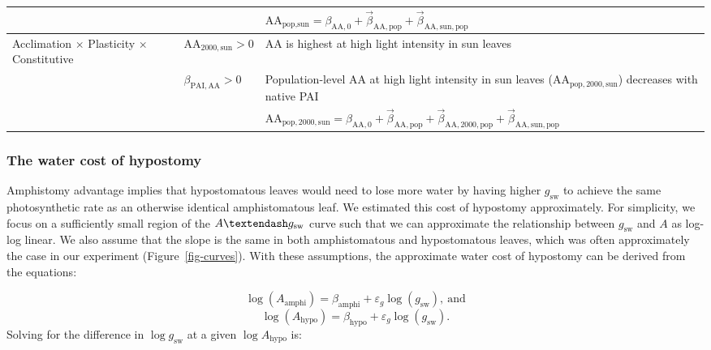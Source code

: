 \documentclass[
  letterpaper,
  DIV=11,
  numbers=noendperiod]{scrartcl}
\newcommand{\aax}{$\mathrm{AA}$}
\newcommand{\agcurve}{$A \textendash g_\text{sw}$}
\newcommand{\gsw}{$g_\text{sw}$}
\begin{document}
\begin{longtable}{>{\raggedright\arraybackslash}p{1in}>{\raggedright\arraybackslash}p{1.5in}>{\raggedright\arraybackslash}p{3in}}
\nopagebreak
 &  & \hspace{-1em}$\mathrm{AA}_{\text{pop},\text{sun}} = \beta_{\mathrm{AA}, 0} + \vec{\beta}_{\mathrm{AA}, \text{pop}} + \vec{\beta}_{\mathrm{AA}, \text{sun}, \text{pop}}$\\
\cmidrule{1-3}\pagebreak[0]
Acclimation $\times$ Plasticity $\times$ Constitutive & $\mathrm{AA}_{2000,\text{sun}} > 0$ & \hspace{-1em}\aax{} is highest at high light intensity in sun leaves\\
\nopagebreak
 & $\beta_{\mathrm{PAI,AA}} > 0$ & \hspace{-1em}Population-level \aax{} at high light intensity in sun leaves ($\mathrm{AA}_{\text{pop},2000,\text{sun}}$) decreases with native PAI\\
\nopagebreak
 &  & \hspace{-1em}$\mathrm{AA}_{\text{pop},2000,\text{sun}} = \beta_{\mathrm{AA}, 0} + \vec{\beta}_{\mathrm{AA}, \text{pop}} + \vec{\beta}_{\mathrm{AA}, 2000, \text{pop}} + \vec{\beta}_{\mathrm{AA}, \text{sun}, \text{pop}}$\\
\bottomrule

\end{longtable}

\subsubsection{The water cost of
hypostomy}\label{the-water-cost-of-hypostomy}

Amphistomy advantage implies that hypostomatous leaves would need to
lose more water by having higher \gsw{} to achieve the same
photosynthetic rate as an otherwise identical amphistomatous leaf. We
estimated this cost of hypostomy approximately. For simplicity, we focus
on a sufficiently small region of the \agcurve{} curve such that we can
approximate the relationship between \gsw{} and \(A\) as log-log linear.
We also assume that the slope is the same in both amphistomatous and
hypostomatous leaves, which was often approximately the case in our
experiment (Figure~\ref{fig-curves}). With these assumptions, the
approximate water cost of hypostomy can be derived from the equations:

\[\log(A_{\mathrm{amphi}}) = \beta_\text{amphi} + \varepsilon_g \log(g_\text{sw}),~\text{and}\]
\[\log(A_{\mathrm{hypo}}) = \beta_\text{hypo} + \varepsilon_g \log(g_\text{sw}).\]
Solving for the difference in \(\log{g_\text{sw}}\) at a given
\(\log{A_{\mathrm{hypo}}}\) is:
\end{document}
